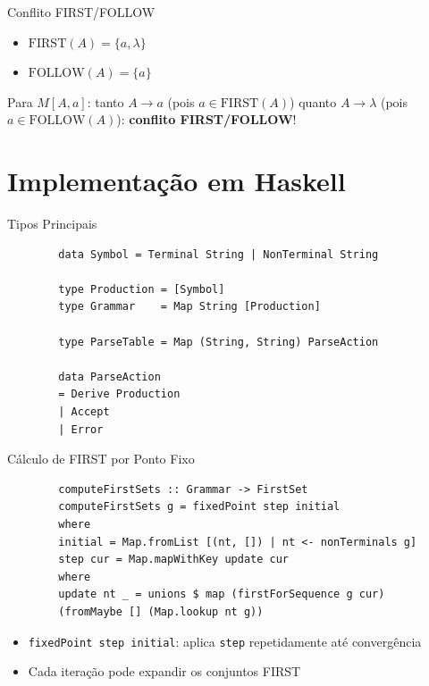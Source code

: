 \begin{frame}{Conflito FIRST/FOLLOW}

    \begin{itemize}

        \item
        \(\mathrm{FIRST}(A) = \{a, \lambda\}\)
        \item
        \(\mathrm{FOLLOW}(A) = \{a\}\)
    \end{itemize}

    Para \(M[A, a]\): tanto \(A \to a\) (pois \(a \in \mathrm{FIRST}(A)\))
    quanto \(A \to \lambda\) (pois \(a \in \mathrm{FOLLOW}(A)\)):
    \textbf{conflito FIRST/FOLLOW}!
\end{frame}


\section{Implementação em
Haskell}\label{implementauxe7uxe3o-em-haskell}

\begin{frame}[fragile]{Tipos Principais}

    \begin{lstlisting}
        data Symbol = Terminal String | NonTerminal String

        type Production = [Symbol]
        type Grammar    = Map String [Production]

        type ParseTable = Map (String, String) ParseAction

        data ParseAction
        = Derive Production
        | Accept
        | Error
    \end{lstlisting}
\end{frame}

\begin{frame}[fragile]{Cálculo de FIRST por Ponto Fixo}

    \begin{lstlisting}
        computeFirstSets :: Grammar -> FirstSet
        computeFirstSets g = fixedPoint step initial
        where
        initial = Map.fromList [(nt, []) | nt <- nonTerminals g]
        step cur = Map.mapWithKey update cur
        where
        update nt _ = unions $ map (firstForSequence g cur)
        (fromMaybe [] (Map.lookup nt g))
    \end{lstlisting}

    \begin{itemize}

        \item
        \texttt{fixedPoint step initial}: aplica
        \texttt{step} repetidamente até convergência
        \item
        Cada iteração pode expandir os conjuntos FIRST
    \end{itemize}
\end{frame}

